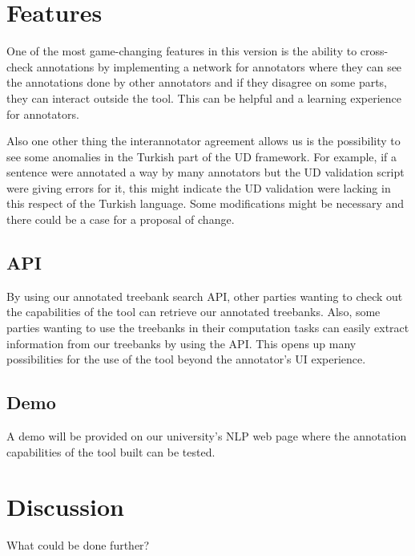 \documentclass[
]{ceurart}
\begin{document}
\section{Features}

One of the most game-changing features in this version is the ability to cross-check annotations by implementing a network for annotators where they can see the annotations done by other annotators and if they disagree on some parts, they can interact outside the tool.
This can be helpful and a learning experience for annotators.

Also one other thing the interannotator agreement allows us is the possibility to see some anomalies in the Turkish part of the UD framework.
For example, if a sentence were annotated a way by many annotators but the UD validation script were giving errors for it, this might indicate the UD validation were lacking in this respect of the Turkish language.
Some modifications might be necessary and there could be a case for a proposal of change.

\subsection{API}

By using our annotated treebank search API, other parties wanting to check out the capabilities of the tool can retrieve our annotated treebanks.
Also, some parties wanting to use the treebanks in their computation tasks can easily extract information from our treebanks by using the API.
This opens up many possibilities for the use of the tool beyond the annotator's UI experience.

\subsection{Demo}

A demo will be provided on our university's NLP web page where the annotation capabilities of the tool built can be tested.

\section{Discussion}

What could be done further?


\end{document}
